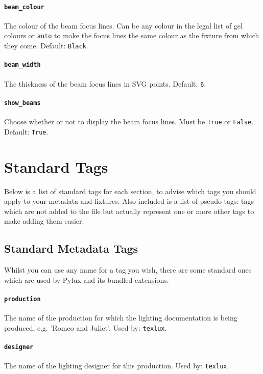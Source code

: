 \documentclass[a4paper]{article}
\begin{document}
\paragraph{\texttt{beam\_colour}}
The colour of the beam focus lines. Can be any colour in the legal list of 
gel colours or \texttt{auto} to make the focus lines the same colour as the 
fixture from which they come. Default: \texttt{Black}.

\paragraph{\texttt{beam\_width}}
The thickness of the beam focus lines in SVG points. Default: \texttt{6}.

\paragraph{\texttt{show\_beams}}
Choose whether or not to display the beam focus lines. Must be \texttt{True} 
or \texttt{False}. Default: \texttt{True}.

\section{Standard Tags} \label{sec:plotfile}
Below is a list of standard tags for each section, to advise which tags you 
should apply to your metadata and fixtures. Also included is a list of 
pseudo-tags: tags which are not added to the file but actually represent one 
or more other tags to make adding them easier.

\subsection{Standard Metadata Tags}
Whilst you can use any name for a tag you wish, there are some standard ones 
which are used by Pylux and its bundled extensions.

\paragraph{\texttt{production}}
The name of the production for which the lighting documentation is being 
produced, e.g. 'Romeo and Juliet'. Used by: \texttt{texlux}.

\paragraph{\texttt{designer}}
The name of the lighting designer for this production. Used by: 
\texttt{texlux}.
\end{document}
